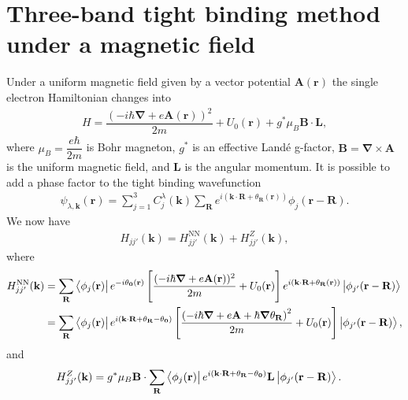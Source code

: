 \documentclass{report}
\newcommand{\f}[2]{\dfrac{#1}{#2}}
\begin{document}
\section{Three-band tight binding method under a magnetic field}
Under a uniform magnetic field given by a vector potential $\mathbf{A}(\mathbf{r})$ the single electron Hamiltonian changes into
\begin{gather}
	H = \f{\left(-i\hbar \boldsymbol{\nabla} + e \mathbf{A(r)}\right)^{2}}{2m} + U_{0}(\mathbf{r}) + g^{*} \mu_{B} \mathbf{B} \cdot \mathbf{L},
\end{gather}
where $\mu_{B} = \f{e\hbar}{2m}$ is Bohr magneton, $g^{*}$ is an effective Landé g-factor, $\mathbf{B} = \boldsymbol{\nabla} \times  \mathbf{A}$ is the uniform magnetic field, and $\mathbf{L}$ is the angular momentum. It is possible to add a phase factor to the tight binding wavefunction
\begin{align}
	\psi_{\lambda,\mathbf{k}} (\mathbf{r}) = \sum_{j=1}^{3} C_{j}^{\lambda}(\mathbf{k}) \sum_{\mathbf{R}} e^{i(\mathbf{k \cdot R} + \theta_{\mathbf{R}}(\mathbf{r}))} \phi_{j}(\mathbf{r} - \mathbf{R}).
\end{align}
We now have
\begin{align}
	H_{j j'} (\mathbf{k}) = H_{jj'}^{\text{NN}}(\mathbf{k}) + H_{jj'}^{Z}(\mathbf{k}),
\end{align}
where
\begin{equation}
	\begin{aligned}
		H_{jj'}^{\text{NN}}(\mathbf{k})
		 & = \sum_{\mathbf{R}} \bra{\phi_{j}(\mathbf{r})} e^{-i \theta_{\mathbf{0}}(\mathbf{r})} \left[\f{(-i\hbar \boldsymbol{\nabla} + e \mathbf{A}(\mathbf{r}))^{2}}{2m} + U_{0}(\mathbf{r}) \right] e^{i (\mathbf{k}\cdot \mathbf{R} + \theta_{\mathbf{R}}(\mathbf{r}))} \ket{\phi_{j'}(\mathbf{r - R})}                \\
		 & = \sum_{\mathbf{R}} \bra{\phi_{j}(\mathbf{r})} e^{i(\mathbf{k \cdot R} +\theta_{\mathbf{R}} - \theta_{\mathbf{0}} )} \left[ \f{ \left( -i\hbar \boldsymbol{\nabla} + e \mathbf{A} + \hbar \boldsymbol{\nabla} \theta_{\mathbf{R}} \right)^{2} }{2m} + U_{0}(\mathbf{r}) \right] \ket{\phi_{j'}(\mathbf{r - R})},
	\end{aligned}
\end{equation}
and
\begin{align}
	H_{jj'}^{Z}(\mathbf{k})
	 & = g^{*} \mu_{B} \mathbf{B} \cdot \sum_{\mathbf{R}} \bra{\phi_{j}(\mathbf{r})} e^{i(\mathbf{k \cdot R} + \theta_{\mathbf{R}} - \theta_{\mathbf{0}} )} \mathbf{L} \ket{\phi_{j'}(\mathbf{r - R})}.
\end{align}
\end{document}

